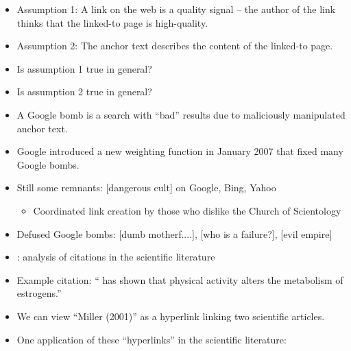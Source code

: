 \documentclass[a4paper,landscape,headrule,footrule,xetex]{foils}
\begin{document}

\begin{itemize}
\item Assumption 1: A link on the web is a quality signal --
  the author of the link thinks that the linked-to page is
  high-quality.
\item Assumption 2: The anchor text describes the content of
  the linked-to page.
\item Is assumption 1 true in general?
\item Is assumption 2 true in general?
\end{itemize}




\begin{itemize}
\item A Google bomb is a search with ``bad'' results due to
maliciously manipulated  anchor text.
\item Google introduced a new weighting function
in January 2007
that fixed many Google bombs.
\item Still some remnants: [dangerous cult] on Google,
  Bing, Yahoo
\begin{itemize}
\item Coordinated link creation by those who dislike the
  Church of Scientology
\end{itemize}
\item Defused Google bombs: [dumb motherf....], [who is a
  failure?], [evil empire]
\end{itemize}





\begin{itemize}
\item {}: analysis of citations in the scientific literature
\item Example citation: `` has shown that physical
  activity alters the metabolism of estrogens.''
\item We can view ``Miller (2001)'' as a hyperlink linking two
  scientific articles.
\item One application of these ``hyperlinks'' in the
  scientific literature:
\end{itemize}
\end{document}
